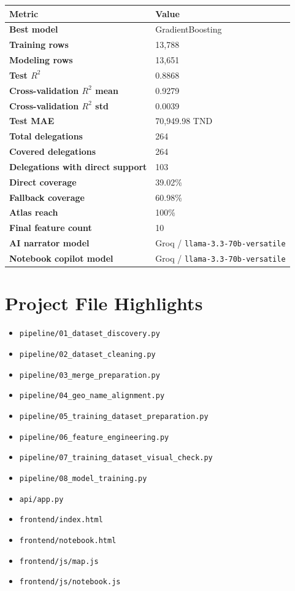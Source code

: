 \documentclass[11pt,a4paper]{article}
\newcommand{\code}[1]{\texttt{#1}}
\begin{document}
\begin{center}
\begin{tabularx}{\textwidth}{>{\bfseries}p{}X}
\toprule
Metric & Value \\
\midrule
Best model & GradientBoosting \\
Training rows & 13,788 \\
Modeling rows & 13,651 \\
Test $R^2$ & 0.8868 \\
Cross-validation $R^2$ mean & 0.9279 \\
Cross-validation $R^2$ std & 0.0039 \\
Test MAE & 70,949.98 TND \\
Total delegations & 264 \\
Covered delegations & 264 \\
Delegations with direct support & 103 \\
Direct coverage & 39.02\% \\
Fallback coverage & 60.98\% \\
Atlas reach & 100\% \\
Final feature count & 10 \\
AI narrator model & Groq / \code{llama-3.3-70b-versatile} \\
Notebook copilot model & Groq / \code{llama-3.3-70b-versatile} \\
\bottomrule
\end{tabularx}
\end{center}

\section{Project File Highlights}

\begin{itemize}
\item \code{pipeline/01\_dataset\_discovery.py}
\item \code{pipeline/02\_dataset\_cleaning.py}
\item \code{pipeline/03\_merge\_preparation.py}
\item \code{pipeline/04\_geo\_name\_alignment.py}
\item \code{pipeline/05\_training\_dataset\_preparation.py}
\item \code{pipeline/06\_feature\_engineering.py}
\item \code{pipeline/07\_training\_dataset\_visual\_check.py}
\item \code{pipeline/08\_model\_training.py}
\item \code{api/app.py}
\item \code{frontend/index.html}
\item \code{frontend/notebook.html}
\item \code{frontend/js/map.js}
\item \code{frontend/js/notebook.js}
\end{itemize}
\end{document}
